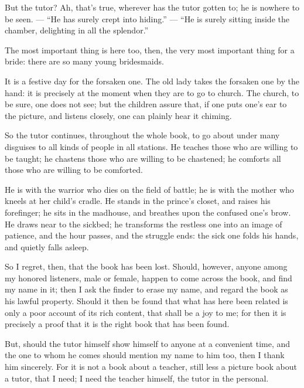\documentclass[12pt,a4paper]{book}
\begin{document}
But the tutor? Ah, that's true, wherever has the tutor gotten to; he is nowhere to be seen. --- ``He has surely crept into hiding.'' --- ``He is surely sitting inside the chamber, delighting in all the splendor.''

The most important thing is here too, then, the very most important thing for a bride: there are so many young bridesmaids.

It is a festive day for the forsaken one. The old lady takes the forsaken one by the hand: it is precisely at the moment when they are to go to church. The church, to be sure, one does not see; but the children assure that, if one puts one's ear to the picture, and listens closely, one can plainly hear it chiming.

So the tutor continues, throughout the whole book, to go about under many disguises to all kinds of
people in all stations. He teaches those who are willing to be taught; he chastens those who are willing to be chastened; he comforts all those who are willing to be comforted.

He is with the warrior who dies on the field of battle; he is with the mother who kneels at her child's cradle. He stands in the prince's closet, and raises his forefinger; he sits in the madhouse, and breathes upon the confused one's brow. He draws near to the sickbed; he transforms the restless one into an image of patience, and the hour passes, and the struggle ends: the sick one folds his hands, and quietly falls asleep.

So I regret, then, that the book has been lost. Should, however, anyone among my honored listeners, male or female, happen to come across the book, and find my name in it; then I ask the finder to erase my name, and regard the book as his lawful property. Should it then be found that what has here been related is only a poor account of its rich content, that shall be a joy to me; for then it is precisely a proof that it is the right book that has been found.

But, should the tutor himself show himself to anyone at a convenient time, and the one to whom he comes should mention my name to him too, then I thank him sincerely. For it is not a book about a teacher, still less a picture book about a tutor, that I need; I need the teacher himself, the tutor in the personal.

\end{document}
